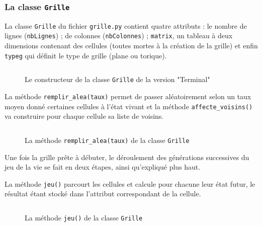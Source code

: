 \documentclass[11pt]{article}
\begin{document}
\subsubsection{La classe \texttt{Grille}}

La classe \texttt{Grille} du fichier \texttt{grille.py} contient quatre attributs : le nombre de lignes (\texttt{nbLignes}) ; de colonnes (\texttt{nbColonnes}) ; \texttt{matrix}, un tableau à deux dimensions contenant des cellules (toutes mortes à la création de la grille) et enfin \texttt{typeg} qui définit le type de grille (plane ou torique).

\begin{figure}[!h]
\inputminted[numbersep=2pt,linenos=true,frame=single,bgcolor=black!5,firstline=19,lastline=26]{python}{../code/grille.py} \vspace*{-0.5cm}
\caption{Le constructeur de la classe \texttt{Grille} de la version "Terminal"}
\end{figure}

La méthode \texttt{remplir_alea(taux)} permet de passer aléatoirement selon un taux moyen donné certaines cellules à l'état vivant et la méthode \texttt{affecte_voisins()} va construire pour chaque cellule sa liste de voisins.

\begin{figure}[!h]
\inputminted[numbersep=2pt,linenos=true,frame=single,bgcolor=black!5,firstline=91,lastline=99]{python}{../code/grille.py} \vspace*{-0.5cm}
\caption{La méthode \texttt{remplir_alea(taux)} de la classe \texttt{Grille}}
\end{figure}


Une fois la grille prête à débuter, le déroulement des générations successives du jeu de la vie se fait en deux étapes, ainsi qu'expliqué plus haut.

La méthode \texttt{jeu()} parcourt les cellules et calcule pour chacune leur état futur, le résultat étant stocké dans l'attribut correspondant de la cellule. 

\begin{figure}[!h]
\inputminted[numbersep=2pt,linenos=true,frame=single,bgcolor=black!5,firstline=101,lastline=107]{python}{../code/grille.py} \vspace*{-0.5cm}
\caption{La méthode \texttt{jeu()} de la classe \texttt{Grille}}
\end{figure}
\end{document}
